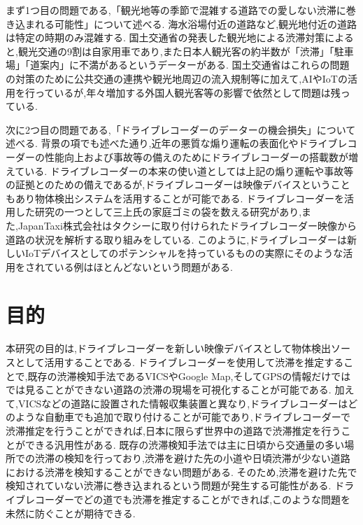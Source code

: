 まず1つ目の問題である,「観光地等の季節で混雑する道路での愛しない渋滞に巻き込まれる可能性」について述べる.
海水浴場付近の道路など,観光地付近の道路は特定の時期のみ混雑する.
国土交通省の発表した観光地による渋滞対策\cite{kankou_jam}によると,観光交通の9割は自家用車であり,また日本人観光客の約半数が「渋滞」「駐車場」「道案内」に不満があるというデーターがある.
国土交通省はこれらの問題の対策のために公共交通の連携や観光地周辺の流入規制等に加えて,AIやIoTの活用を行っている\cite{kankou_ai}が,年々増加する外国人観光客等の影響で依然として問題は残っている.

次に2つ目の問題である,「ドライブレコーダーのデーターの機会損失」について述べる.
背景の項でも述べた通り,近年の悪質な煽り運転の表面化やドライブレコーダーの性能向上および事故等の備えのためにドライブレコーダーの搭載数が増えている.
ドライブレコーダーの本来の使い道としては上記の煽り運転や事故等の証拠とのための備えであるが,ドライブレコーダーは映像デバイスということもあり物体検出システムを活用することが可能である.
ドライブレコーダーを活用した研究の一つとして三上氏の家庭ゴミの袋を数える研究\cite{三上量弘2020deepcounter}があり,また,JapanTaxi株式会社はタクシーに取り付けられたドライブレコーダー映像から道路の状況を解析する取り組みをしている\cite{japantaxi}.
このように,ドライブレコーダーは新しいIoTデバイスとしてのポテンシャルを持っているものの実際にそのような活用をされている例はほとんどないという問題がある.


\section{目的}

本研究の目的は,ドライブレコーダーを新しい映像デバイスとして物体検出ソースとして活用することである.
ドライブレコーダーを使用して渋滞を推定することで,既存の渋滞検知手法であるVICSやGoogle Map,そしてGPSの情報だけではでは見ることができない道路の渋滞の現場を可視化することが可能である.
加えて,VICSなどの道路に設置された情報収集装置と異なり,ドライブレコーダーはどのような自動車でも追加で取り付けることが可能であり,ドライブレコーダーで渋滞推定を行うことができれば,日本に限らず世界中の道路で渋滞推定を行うことができる汎用性がある.
既存の渋滞検知手法では主に日頃から交通量の多い場所での渋滞の検知を行っており,渋滞を避けた先の小道や日頃渋滞が少ない道路における渋滞を検知することができない問題がある.
そのため,渋滞を避けた先で検知されていない渋滞に巻き込まれるという問題が発生する可能性がある.
ドライブレコーダーでどの道でも渋滞を推定することができれば,このような問題を未然に防ぐことが期待できる.

